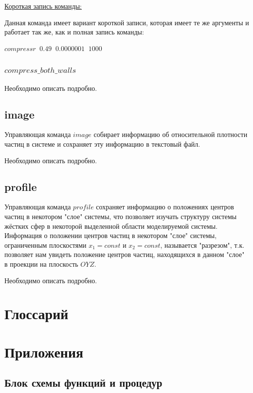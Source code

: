 \documentclass[a4paper]{article}
\begin{document}
\uline{Короткая запись команды:}

Данная команда имеет вариант короткой записи, которая имеет те же аргументы и работает так же, как и полная запись команды:

$ compressr \;\; 0.49 \;\; 0.0000001 \;\; 1000 $


\subsubsection{$ compress\_both\_walls $}
Необходимо описать подробно.

\subsection{image}

Управляющая команда $ image $ собирает информацию об относительной плотности частиц в системе и сохраняет эту информацию в текстовый файл.

Необходимо описать подробно.


\subsection{profile}

Управляющая команда $ profile $ сохраняет информацию о положениях центров частиц в некотором "слое" системы, что позволяет изучать структуру системы жёстких сфер в некоторой выделенной области моделируемой системы. Информация о положении центров частиц в некотором "слое" системы, ограниченным плоскостями $ x_1 = const $ и $ x_2 = const $, называется "разрезом", т.к. позволяет нам увидеть положение центров частиц, находящихся в данном "слое" в проекции на плоскость $ OYZ $.

Необходимо описать подробно.

\newpage
\section{Глоссарий}

\newpage




\newpage
\section{Приложения}

\subsection{Блок схемы функций и процедур}
\end{document}
